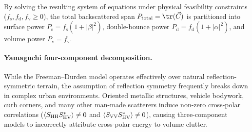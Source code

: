 By solving the resulting system of equations under physical feasibility constraints ($f_{\mathrm{s}}, f_{\mathrm{d}}, f_{\mathrm{v}} \ge 0$), the total backscattered span $P_{\mathrm{total}} = \tr(\vec C)$ is partitioned into surface power $P_{\mathrm{s}} = f_{\mathrm{s}}(1 + |\beta|^2)$, double-bounce power $P_{\mathrm{d}} = f_{\mathrm{d}}(1 + |\alpha|^2)$, and volume power $P_{\mathrm{v}} = f_{\mathrm{v}}$.

\paragraph{Yamaguchi four-component decomposition.}
While the Freeman--Durden model operates effectively over natural reflection-symmetric terrain, the assumption of reflection symmetry frequently breaks down in complex urban environments.
Oriented metallic structures, vehicle bodywork, curb corners, and many other man-made scatterers induce non-zero cross-polar correlations ($\langle S_{\mathrm{HH}} S_{\mathrm{HV}}^* \rangle \neq 0$ and $\langle S_{\mathrm{VV}} S_{\mathrm{HV}}^* \rangle \neq 0$), causing three-component models to incorrectly attribute cross-polar energy to volume clutter.

